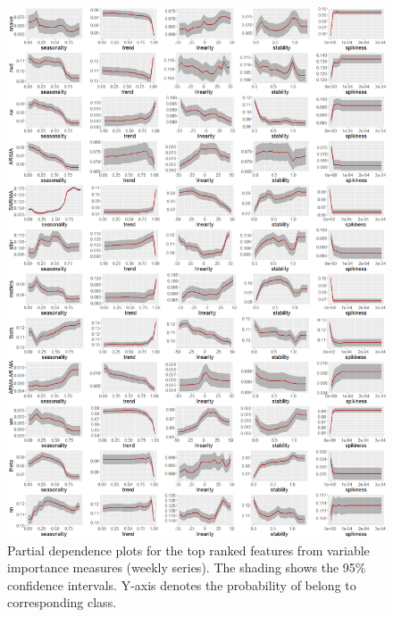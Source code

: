 \documentclass[11pt,a4paper,]{article}
\begin{document}
\begin{figure}
\centering
\includegraphics{figures/weeklypdp-1.png}
\caption{\label{fig:weeklypdp}Partial dependence plots for the top ranked
features from variable importance measures (weekly series). The shading
shows the 95\% confidence intervals. Y-axis denotes the probability of
belong to corresponding class.}
\end{figure}

\newpage
\end{document}

